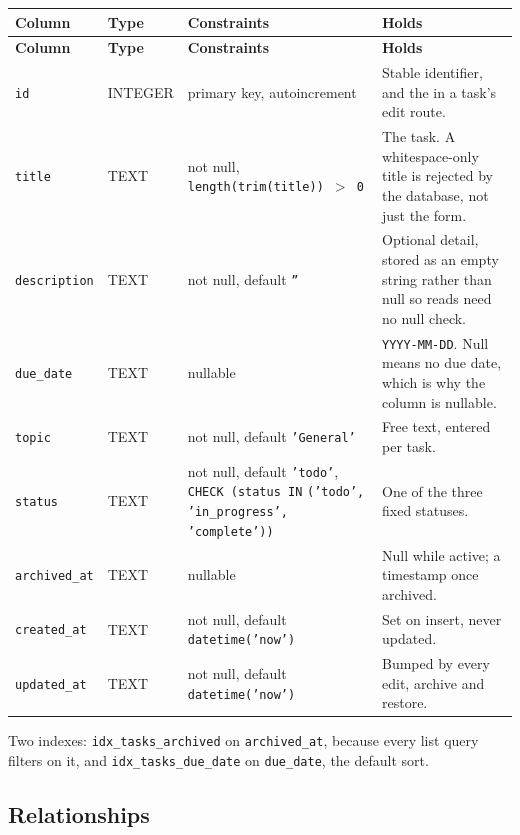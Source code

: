 \documentclass[11pt,a4paper]{article}
\begin{document}
\begin{longtable}{L{2.5cm} L{2.05cm} L{4.35cm} L{5cm}}
\toprule
\textbf{Column} & \textbf{Type} & \textbf{Constraints} & \textbf{Holds} \\
\midrule
\endfirsthead
\toprule
\textbf{Column} & \textbf{Type} & \textbf{Constraints} & \textbf{Holds} \\
\midrule
\endhead
\texttt{id} & INTEGER & primary key, autoincrement & Stable identifier, and the
 in a task's edit route. \\
\addlinespace
\texttt{title} & TEXT & not null, \texttt{length(trim(title)) $>$ 0} & The task.
A whitespace-only title is rejected by the database, not just the form. \\
\addlinespace
\texttt{description} & TEXT & not null, default \texttt{''} & Optional detail,
stored as an empty string rather than null so reads need no null check. \\
\addlinespace
\texttt{due\_date} & TEXT & nullable & \texttt{YYYY-MM-DD}. Null means no due
date, which is why the column is nullable. \\
\addlinespace
\texttt{topic} & TEXT & not null, default \texttt{'General'} & Free text, entered
per task. \\
\addlinespace
\texttt{status} & TEXT & not null, default \texttt{'todo'},
\texttt{CHECK (status IN} \newline \texttt{('todo', 'in\_progress',} \newline
\texttt{'complete'))} & One of the three fixed statuses. \\
\addlinespace
\texttt{archived\_at} & TEXT & nullable & Null while active; a timestamp once
archived. \\
\addlinespace
\texttt{created\_at} & TEXT & not null, default \texttt{datetime('now')} & Set on
insert, never updated. \\
\addlinespace
\texttt{updated\_at} & TEXT & not null, default \texttt{datetime('now')} & Bumped
by every edit, archive and restore. \\
\bottomrule
\end{longtable}

Two indexes: \texttt{idx\_tasks\_archived} on \texttt{archived\_at}, because
every list query filters on it, and \texttt{idx\_tasks\_due\_date} on
\texttt{due\_date}, the default sort.

\subsection{Relationships}
\end{document}
